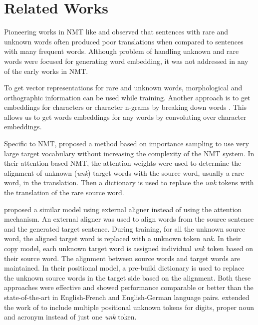 \section{Related Works}
Pioneering works in NMT like \cite{sutskever2014sequence} and \cite{bahdanau2014neural} observed that sentences with rare and unknown words often produced poor translations when compared to sentences with many frequent words. Although problem of handling unknown and rare words were focused for generating word embedding, it was not addressed in any of the early works in NMT\citep{luong2015addressing}. 

To get vector representations for rare and unknown words,  morphological and orthographic information can be used\citep{botha2014compositional,luong2013better,bhatia2016morphological} while training. Another approach is to get embeddings for characters or character n-grams by breaking down words \citep{bojanowski2016enriching,kim2016character,wieting2016charagram}. This allows us to get words embeddings for any words by convoluting over character embeddings.



Specific to NMT, \cite{jean2014using} proposed a method based on importance sampling to use very large target vocabulary without increasing the complexity of the NMT system. In their attention based NMT, the attention weights were used to determine the alignment of unknown (\textit{unk}) target words with the source word, usually a rare word, in the translation. Then a dictionary is used to replace the \textit{unk} tokens with the translation of the rare source word.

\cite{luong2015addressing} proposed a similar model using external aligner instead of using the attention mechanism. An external aligner was used to align words from the source sentence and the generated target sentence. During training, for all the unknown source word, the aligned target word is replaced with a unknown token \textit{unk}. In their copy model, each unknown target word is assigned individual \textit{unk} token based on their source word. The alignment between source words and target words are maintained. In their positional model, a pre-build dictionary is used to replace the unknown source words in the target side based on the alignment. Both these approaches were effective and showed performance comparable or better than the state-of-the-art in English-French and English-German language pairs. \cite{choi2017context} extended the work of \cite{luong2015addressing} to include multiple positional unknown tokens for digits, proper noun and acronym instead of just one \textit{unk} token. 


